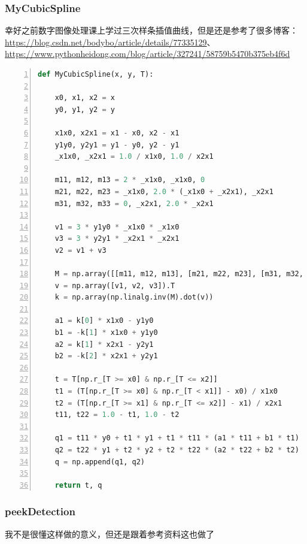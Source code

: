 \documentclass[cs4size,a4paper]{ctexart}
\numberwithin{equation}{section}
\numberwithin{table}{section}
\numberwithin{figure}{section}
\begin{document}
\subsubsection{MyCubicSpline}

幸好之前数字图像处理课上学过三次样条插值曲线，但是还是参考了很多博客：\url{https://blog.csdn.net/bodybo/article/details/77335129}、\url{https://www.pythonheidong.com/blog/article/327241/58759b5470b375eb4f6d}

\begin{lstlisting}[language={python},
numbers=left,
numberstyle=\tiny\monaco,
basicstyle=\footnotesize\monaco]
def MyCubicSpline(x, y, T):
    
    x0, x1, x2 = x
    y0, y1, y2 = y

    x1x0, x2x1 = x1 - x0, x2 - x1
    y1y0, y2y1 = y1 - y0, y2 - y1
    _x1x0, _x2x1 = 1.0 / x1x0, 1.0 / x2x1

    m11, m12, m13 = 2 * _x1x0, _x1x0, 0
    m21, m22, m23 = _x1x0, 2.0 * (_x1x0 + _x2x1), _x2x1
    m31, m32, m33 = 0, _x2x1, 2.0 * _x2x1

    v1 = 3 * y1y0 * _x1x0 * _x1x0
    v3 = 3 * y2y1 * _x2x1 * _x2x1
    v2 = v1 + v3

    M = np.array([[m11, m12, m13], [m21, m22, m23], [m31, m32, m33]])
    v = np.array([v1, v2, v3]).T
    k = np.array(np.linalg.inv(M).dot(v))

    a1 = k[0] * x1x0 - y1y0
    b1 = -k[1] * x1x0 + y1y0
    a2 = k[1] * x2x1 - y2y1
    b2 = -k[2] * x2x1 + y2y1

    t = T[np.r_[T >= x0] & np.r_[T <= x2]]
    t1 = (T[np.r_[T >= x0] & np.r_[T < x1]] - x0) / x1x0
    t2 = (T[np.r_[T >= x1] & np.r_[T <= x2]] - x1) / x2x1
    t11, t22 = 1.0 - t1, 1.0 - t2

    q1 = t11 * y0 + t1 * y1 + t1 * t11 * (a1 * t11 + b1 * t1)
    q2 = t22 * y1 + t2 * y2 + t2 * t22 * (a2 * t22 + b2 * t2)
    q = np.append(q1, q2)

    return t, q
\end{lstlisting}

\subsubsection{peekDetection}

我不是很懂这样做的意义，但还是跟着参考资料这也做了
\end{document}
